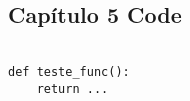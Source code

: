\begin{appendices}
\chapter{Capítulo 5 Code}

\begin{lstlisting}

def teste_func():
	return ...

\end{lstlisting}

\end{appendices}


 









